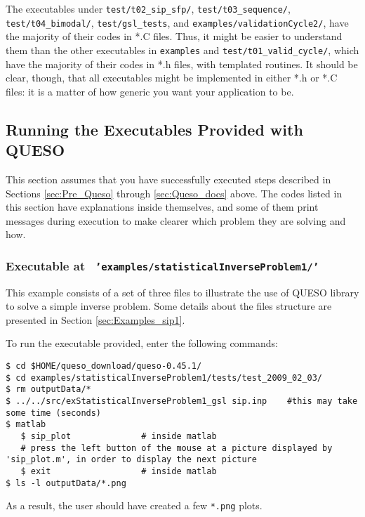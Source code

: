 The executables under \texttt{test/t02\_sip\_sfp/},  \texttt{test/t03\_sequence/}, \texttt{test/t04\_bimodal/},   \texttt{test/gsl\_tests}, and \texttt{examples/validationCycle2/}, have the majority of their codes in *.C files.
Thus, it might be easier to understand them than the other executables in  \texttt{examples} and \texttt{test/t01\_valid\_cycle/}, which
have the majority of their codes in *.h files, with templated routines.
It should be clear, though, that all executables might be implemented in either *.h or *.C files: it is a matter of how generic you want your application to be.


\subsection{Running the Executables Provided with QUESO} \label{sc-running-execs}

This section assumes that you have successfully executed steps described in Sections \ref{sec:Pre_Queso} through \ref{sec:Queso_docs} above.
The codes listed in this section have explanations inside themselves, and some of them
print messages during execution to make clearer which problem they are solving and how.

\subsubsection{Executable at \texttt{ 'examples/statisticalInverseProblem1/'}}\label{sec:executable_sip}

This example consists of a set of three files to illustrate the use of QUESO library to solve a simple inverse problem. Some details about the files structure are presented in Section \ref{sec:Examples_sip1}.

To run the executable provided, enter the following commands:
\begin{lstlisting}[label={},caption={}]
$ cd $HOME/queso_download/queso-0.45.1/
$ cd examples/statisticalInverseProblem1/tests/test_2009_02_03/
$ rm outputData/*
$ ../../src/exStatisticalInverseProblem1_gsl sip.inp    #this may take some time (seconds)
$ matlab
   $ sip_plot	           # inside matlab
   # press the left button of the mouse at a picture displayed by 'sip_plot.m', in order to display the next picture
   $ exit	               # inside matlab
$ ls -l outputData/*.png
\end{lstlisting}

As a result, the user should have created a few \verb+*.png+ plots.

